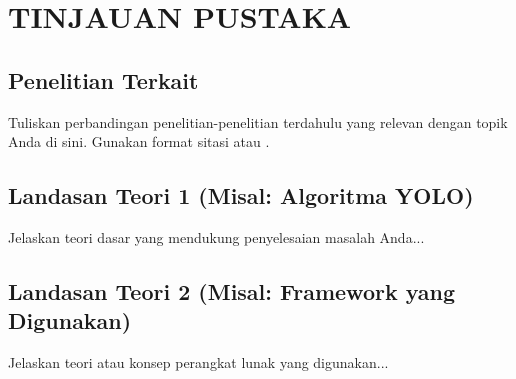 \chapter{TINJAUAN PUSTAKA}


\section{Penelitian Terkait}
Tuliskan perbandingan penelitian-penelitian terdahulu yang relevan dengan topik Anda di sini. Gunakan format sitasi \citep{jiang2022} atau \citet{marleni2023}.

\section{Landasan Teori 1 (Misal: Algoritma YOLO)}
Jelaskan teori dasar yang mendukung penyelesaian masalah Anda...

\section{Landasan Teori 2 (Misal: Framework yang Digunakan)}
Jelaskan teori atau konsep perangkat lunak yang digunakan...